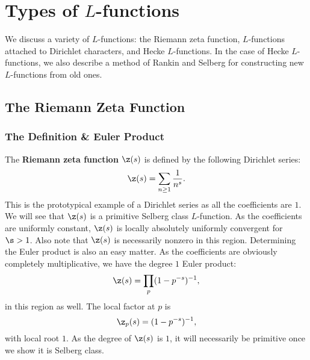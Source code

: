 \chapter{Types of \texorpdfstring{$L$}{L}-functions}
  We discuss a variety of $L$-functions: the Riemann zeta function, $L$-functions attached to Dirichlet characters, and Hecke $L$-functions. In the case of Hecke $L$-functions, we also describe a method of Rankin and Selberg for constructing new $L$-functions from old ones.
  \section{The Riemann Zeta Function}
    \subsection*{The Definition \& Euler Product}
      The \textbf{Riemann zeta function} $\z(s)$ is defined by the following Dirichlet series:
      \[
        \z(s) = \sum_{n \ge 1}\frac{1}{n^{s}}.
      \]
      This is the prototypical example of a Dirichlet series as all the coefficients are $1$. We will see that $\z(s)$ is a primitive Selberg class $L$-function. As the coefficients are uniformly constant, $\z(s)$ is locally absolutely uniformly convergent for $\s > 1$. Also note that $\z(s)$ is necessarily nonzero in this region. Determining the Euler product is also an easy matter. As the coefficients are obviously completely multiplicative, we have the degree $1$ Euler product:
      \[
        \z(s) = \prod_{p}(1-p^{-s})^{-1},
      \]
      in this region as well. The local factor at $p$ is
      \[
        \z_{p}(s) = (1-p^{-s})^{-1},
      \]
      with local root $1$. As the degree of $\z(s)$ is $1$, it will necessarily be primitive once we show it is Selberg class.
